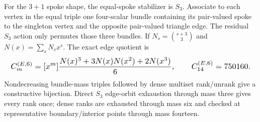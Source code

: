 \documentclass{article}
\newcommand{\fitmath}[1]{\resizebox{0.99\linewidth}{!}{$\displaystyle #1$}}
\begin{document}
For the $3+1$ spoke shape, the equal-spoke stabilizer is $S_3$. Associate
to each vertex in the equal triple one four-scalar bundle containing its
pair-valued spoke to the singleton vertex and the opposite pair-valued triangle
edge. The residual $S_3$ action only permutes those three bundles. If
$N_{s}=\binom{s+3}{3}$ and $N(x)=\sum_{s} N_{s} x^{s}$. The exact edge
quotient is
\begin{equation}
  \fitmath{%
    C^{(E,6)}_m=
      [x^m]\frac{N(x)^3+3N(x)N(x^2)+2N(x^3)}{6},
    \qquad C^{(E,6)}_{14}=750160.
  }
  \label{eq:optimization-crazy-preimage-cube-quintuple-s4-s3-edge-ranking}
\end{equation}
Nondecreasing bundle-mass triples followed by dense multiset rank/unrank give a
constructive bijection. Direct $S_3$ edge-orbit exhaustion through mass three
gives every rank once; dense ranks are exhausted through mass six and checked
at representative boundary/interior points through mass fourteen.
\end{document}
